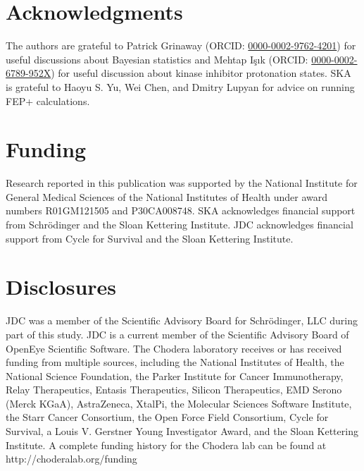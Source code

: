 \documentclass[phd,tocprelim]{cornell}
\begin{document}
\section{Acknowledgments}

The authors are grateful to Patrick Grinaway (ORCID: \href{http://orcid.org/0000-0002-9762-4201}{0000-0002-9762-4201}) for useful discussions about Bayesian statistics and Mehtap Işık (ORCID: \href{https://orcid.org/0000-0002-6789-952X}{0000-0002-6789-952X}) for useful discussion about kinase inhibitor protonation states. SKA is grateful to  Haoyu S. Yu, Wei Chen, and Dmitry Lupyan for advice on running FEP+ calculations. 


\section{Funding}

Research reported in this publication was supported by the National Institute for General Medical Sciences of the National Institutes of Health under award numbers R01GM121505 and P30CA008748.
SKA acknowledges financial support from Schr\"{o}dinger and the Sloan Kettering Institute.
JDC acknowledges financial support from Cycle for Survival and the Sloan Kettering Institute.


\section{Disclosures}

JDC was a member of the Scientific Advisory Board for Schrödinger, LLC during part of this study.
JDC is a current member of the Scientific Advisory Board of OpenEye Scientific Software.
The Chodera laboratory receives or has received funding from multiple sources, including the National Institutes of Health, the National Science Foundation, the Parker Institute for Cancer Immunotherapy, Relay Therapeutics, Entasis Therapeutics, Silicon Therapeutics, EMD Serono (Merck KGaA), AstraZeneca, XtalPi, the Molecular Sciences Software Institute, the Starr Cancer Consortium, the Open Force Field Consortium, Cycle for Survival, a Louis V. Gerstner Young Investigator Award, and the Sloan Kettering Institute.
A complete funding history for the Chodera lab can be found at http://choderalab.org/funding
\end{document}
